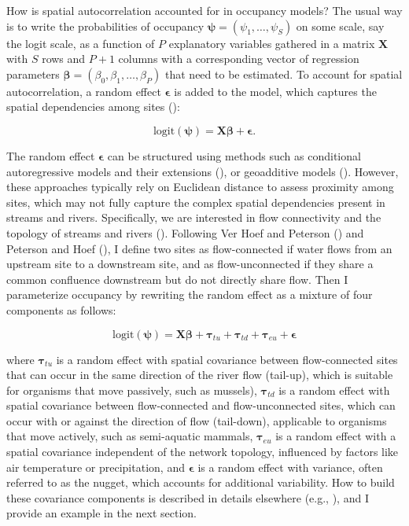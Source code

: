 \documentclass[
  11pt,
  a4paper,
]{article}
\begin{document}
How is spatial autocorrelation accounted for in occupancy models? The usual way is to write the probabilities of occupancy \(\boldsymbol{\psi} = (\psi_1, \ldots, \psi_S)\) on some scale, say the logit scale, as a function of \(P\) explanatory variables gathered in a matrix \(\mathbf{X}\) with \(S\) rows and \(P+1\) columns with a corresponding vector of regression parameters \(\boldsymbol{\beta} = (\beta_0, \beta_1, \ldots, \beta_P)\) that need to be estimated. To account for spatial autocorrelation, a random effect \(\boldsymbol{\epsilon}\) is added to the model, which captures the spatial dependencies among sites ():

\begin{equation}
\text{logit}(\boldsymbol{\psi}) = \mathbf{X} \boldsymbol{\beta} + \boldsymbol{\epsilon}.
\end{equation}

The random effect \(\boldsymbol{\epsilon}\) can be structured using methods such as conditional autoregressive models and their extensions (), or geoadditive models (). However, these approaches typically rely on Euclidean distance to assess proximity among sites, which may not fully capture the complex spatial dependencies present in streams and rivers. Specifically, we are interested in flow connectivity and the topology of streams and rivers (). Following Ver Hoef and Peterson () and Peterson and Hoef (), I define two sites as flow-connected if water flows from an upstream site to a downstream site, and as flow-unconnected if they share a common confluence downstream but do not directly share flow. Then I parameterize occupancy by rewriting the random effect as a mixture of four components as follows:

\begin{equation}
\text{logit}(\boldsymbol{\psi}) = \mathbf{X} \boldsymbol{\beta} + \boldsymbol{\tau}_{tu} + \boldsymbol{\tau}_{td} + \boldsymbol{\tau}_{eu} + \boldsymbol{\epsilon}
\end{equation}

where \(\boldsymbol{\tau}_{tu}\) is a random effect with spatial covariance between flow-connected sites that can occur in the same direction of the river flow (tail-up), which is suitable for organisms that move passively, such as mussels), \(\boldsymbol{\tau}_{td}\) is a random effect with spatial covariance between flow-connected and flow-unconnected sites, which can occur with or against the direction of flow (tail-down), applicable to organisms that move actively, such as semi-aquatic mammals, \(\boldsymbol{\tau}_{eu}\) is a random effect with a spatial covariance independent of the network topology, influenced by factors like air temperature or precipitation, and \(\boldsymbol{\epsilon}\) is a random effect with variance, often referred to as the nugget, which accounts for additional variability. How to build these covariance components is described in details elsewhere (e.g., ), and I provide an example in the next section.
\end{document}
